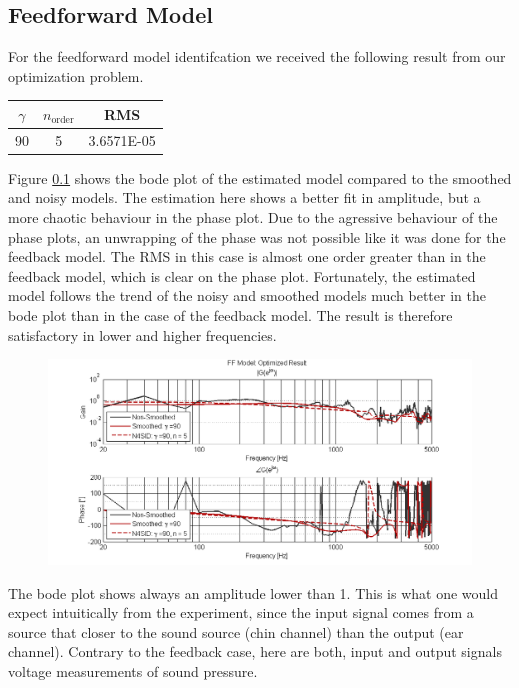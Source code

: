 \subsection{Feedforward Model}
For the feedforward model identifcation we received the following result from our optimization problem. 

\begin{table}[H]
\centering
    \begin{tabular}{c|c|c}
    
    $\gamma$ & $n_\text{order}$ & RMS \\ \hline
    90      & 5                &  3.6571E-05   \\ 
    \end{tabular}
\end{table}

Figure \ref{} shows the bode plot of the estimated model compared to the smoothed and noisy models. The estimation here shows a better fit in amplitude, but a more chaotic behaviour in the phase plot. Due to the agressive behaviour of the phase plots, an unwrapping of the phase was not possible like it was done for the feedback model. The RMS in this case is almost one order greater than in the feedback model, which is clear on the phase plot. Fortunately, the estimated model follows the trend of the noisy and smoothed models much better in the bode plot than in the case of the feedback model. The result is therefore satisfactory in lower and higher frequencies.\\

\begin{figure}[H]
\centering
\includegraphics[width=1.0\textwidth]{pics/results_FF}
\caption{}
\label{pic:}
\end{figure}

The bode plot shows always an amplitude lower than 1. This is what one would expect intuitically from the experiment, since the input signal comes from a source that closer to the sound source (chin channel) than the output (ear channel). Contrary to the feedback case, here are both, input and output signals voltage measurements of sound pressure.

